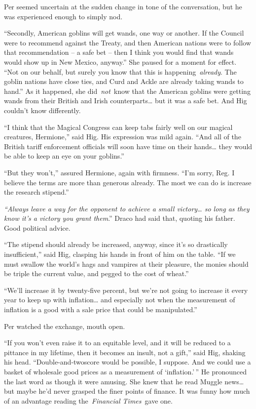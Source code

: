 Per seemed uncertain at the sudden change in tone of the conversation,
but he was experienced enough to simply nod.

``Secondly, American goblins will get wands, one way or another. If the
Council were to recommend against the Treaty, and then American nations
were to follow that recommendation -- a safe bet -- then I think you
would find that wands would show up in New Mexico, anyway.'' She paused
for a moment for effect. ``Not on our behalf, but surely you know that
this is happening~\emph{already}. The goblin nations have close ties,
and Curd and Ackle are already taking wands to hand.'' As it happened,
she did~\emph{not}~know that the American goblins were getting wands
from their British and Irish counterparts\ldots{} but it was a safe bet.
And Hig couldn't know differently.

``I think that the Magical Congress can keep tabs fairly well on our
magical creatures, Hermione,'' said Hig. His expression was mild again.
``And all of the British tariff enforcement officials will soon have
time on their hands\ldots{} they would be able to keep an eye on your
goblins.''

``But they won't,'' assured Hermione, again with firmness. ``I'm sorry,
Reg. I believe the terms are more than generous already. The most we can
do is increase the research stipend.''

\emph{``Always leave a way for the opponent to achieve a small
victory\ldots{} so long as they know it's a victory you grant them}.''
Draco had said that, quoting his father. Good political advice.

``The stipend should already be increased, anyway, since it's so
drastically insufficient,'' said Hig, clasping his hands in front of him
on the table. ``If we must swallow the world's hags and vampires at
their pleasure, the monies should be triple the current value, and
pegged to the cost of wheat.''

``We'll increase it by twenty-five percent, but we're not going to
increase it every year to keep up with inflation\ldots{} and especially
not when the measurement of inflation is a good with a sale price that
could be manipulated.''

Per watched the exchange, mouth open.

``If you won't even raise it to an equitable level, and it will be
reduced to a pittance in my lifetime, then it becomes an insult, not a
gift,'' said Hig, shaking his head. ``Double-and-twoscore would be
possible, I suppose. And we could use a basket of wholesale good prices
as a measurement of `inflation.'\,'' He pronounced the last word as
though it were amusing. She knew that he read Muggle news\ldots{} but
maybe he'd never grasped the finer points of finance. It was funny how
much of an advantage reading the~\emph{Financial Times}~gave one.

